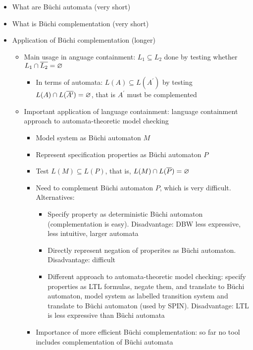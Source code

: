 \begin{itemize}
\item What are Büchi automata (very short)
\item What is Büchi complementation (very short)
\item Application of Büchi complementation (longer)
  \begin{itemize}
  \item Main usage in anguage containment: $L_1 \subseteq L_2$ done by testing whether $L_1 \cap \cl1{L_2} = \varnothing$
    \begin{itemize}
    \item In terms of automata: $L(A) \subseteq L(A^\prime)$ by testing $L(A) \cap L(\cl1{A^\prime}) = \varnothing$, that is $A^\prime$ must be complemented
    \end{itemize}
  \item Important application of language containment: language containment approach to automata-theoretic model checking
    \begin{itemize}
    \item Model system as Büchi automaton $M$
    \item Represent specification properties as Büchi automaton $P$
    \item Test $L(M) \subseteq L(P)$, that is, $L(M) \cap L(\cl1{P}) = \varnothing$
    \item Need to complement Büchi automaton $P$, which is very difficult. Alternatives:
      \begin{itemize}
      \item Specify property as deterministic Büchi automaton (complementation is easy). Disadvantage: DBW less expressive, less intuitive, larger automata
      \item Directly represent negation of properites as Büchi automaton. Disadvantage: difficult
      \item Different approach to automata-theoretic model checking: specify properties as LTL formulas, negate them, and translate to Büchi automaton, model system as labelled transition system and translate to Büchi automaton (used by SPIN). Disadvantage: LTL is less expressive than Büchi automata
      \end{itemize}
    \item Importance of more efficient Büchi complementation: so far no tool includes complementation of Büchi automata~\cite{2007_vardi_model_checking}
    \end{itemize}
  \end{itemize}
\end{itemize}


